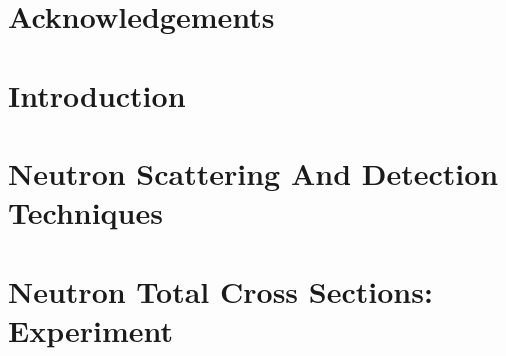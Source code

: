 \documentclass[twosided, 12pt]{book} %
\newcommand\blankpage{%
    \null
    \thispagestyle{empty}%
    \addtocounter{page}{-1}%
\newpage}
\newcommand{\textDirectory}{text}
\begin{document}
\frontmatter



\begingroup
\let\cleardoublepage\clearpage
\tableofcontents
\endgroup

\fancyhead{}
\fancyhead[LO]{\MakeUppercase{\leftmark}}

\begingroup
\let\cleardoublepage\clearpage
{}
\listoffigures
\endgroup

\clearpage

\fancyhead{}
\fancyhead[LO]{\MakeUppercase{\leftmark}}

\begingroup
\let\cleardoublepage\clearpage
{}
\listoftables
\endgroup

\clearpage
{}
\fancyhead{}

\begingroup
\let\cleardoublepage\clearpage
\chapter*{Acknowledgements}

\endgroup



\afterpage{\blankpage}
\clearpage

\mainmatter

\fancyhead{} %
\fancyhead[LE]{\MakeUppercase{\rightmark}} %

\chapter{Introduction} \label{introduction}


\chapter{Neutron Scattering And Detection Techniques} \label{Techniques}


\chapter{Neutron Total Cross Sections: Experiment} \label{TCSExperiment}

\end{document}
